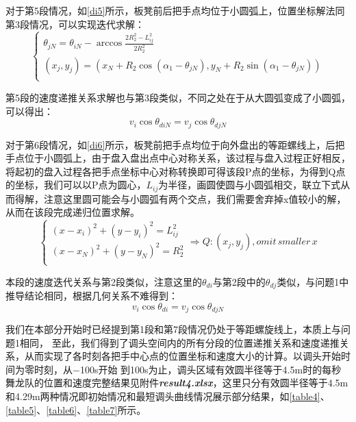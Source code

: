 \documentclass[withoutpreface,bwprint]{cumcmthesis} %
\begin{document}
对于第5段情况，如\cref{di5}所示，板凳前后把手点均位于小圆弧上，位置坐标解法同第3段情况，可以实现迭代求解：
\begin{equation}
    \begin{cases}
    \theta_{jN} = \theta_{iN} - \arccos{\frac{2R_2^2-L_{ij}^2}{2R_2^2}}\\
    (x_j,y_j) = (x_N+R_2\cos{(\alpha_1-\theta_{jN})},y_N+R_2\sin{(\alpha_1-\theta_{jN})})\\
    \end{cases}
    \label{eq31}
\end{equation}

第5段的速度递推关系求解也与第3段类似，不同之处在于从大圆弧变成了小圆弧，可以得出：
\begin{equation}
    v_i\cos{\theta_{diN}} = v_j\cos{\theta_{djN}}
    \label{eq32}
\end{equation}

对于第6段情况，如\cref{di6}所示，板凳前把手点均位于向外盘出的等距螺线上，后把手点位于小圆弧上，由于盘入盘出点中心对称关系，该过程与盘入过程正好相反，将起初的盘入过程各把手点坐标中心对称转换即可得该段P点的坐标，为得到Q点的坐标，我们可以以P点为圆心，$L_{ij}$为半径，画圆使圆与小圆弧相交，联立下式从而得解，注意这里圆可能会与小圆弧有两个交点，我们需要舍弃掉x值较小的解，从而在该段完成递归位置求解。
\begin{equation}
    \begin{cases}
    (x-x_i)^2+(y-y_i)^2 = L_{ij}^2\\
    (x-x_N)^2+(y-y_N)^2 = R_2^2\\
    \end{cases}
    \Rightarrow
    Q:(x_j,y_j),omit\,smaller\,x
    \label{eq33}
\end{equation}

本段的速度迭代关系与第2段类似，注意这里的$\theta_{di}$与第2段中的$\theta_{dj}$类似，与问题1中推导结论相同，根据几何关系不难得到：
\begin{equation}
    v_i\cos{\theta_{di}} = v_j\cos{\theta_{djN}}
    \label{eq34}
\end{equation}

我们在本部分开始时已经提到第1段和第7段情况仍处于等距螺旋线上，本质上与问题1相同，
至此，我们得到了调头空间内的所有分段的位置递推关系和速度递推关系，从而实现了各时刻各把手中心点的位置坐标和速度大小的计算。以调头开始时间为零时刻，从−100s开始
到100s为止，调头区域有效圆半径等于4.5m时的每秒舞龙队的位置和速度完整结果见附件\textbf{\textit{result4.xlsx}}，这里只分有效圆半径等于4.5m和4.29m两种情况即初始情况和最短调头曲线情况展示部分结果，如\cref{table4}、\cref{table5}、\cref{table6}、\cref{table7}所示。
\end{document}
